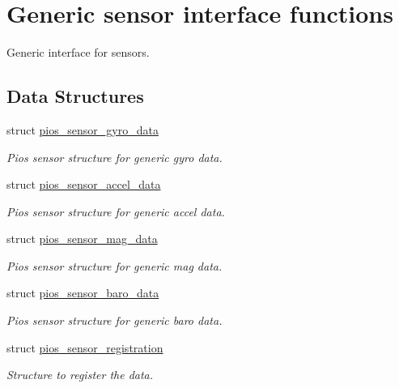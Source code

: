 \hypertarget{group___p_i_o_s___s_e_n_s_o_r_s}{\section{\-Generic sensor interface functions}
\label{group___p_i_o_s___s_e_n_s_o_r_s}
}


\-Generic interface for sensors.  


\subsection*{\-Data \-Structures}
\begin{DoxyCompactItemize}
\item 
struct \hyperlink{structpios__sensor__gyro__data}{pios\-\_\-sensor\-\_\-gyro\-\_\-data}
\begin{DoxyCompactList}\small\item\em \-Pios sensor structure for generic gyro data. \end{DoxyCompactList}\item 
struct \hyperlink{structpios__sensor__accel__data}{pios\-\_\-sensor\-\_\-accel\-\_\-data}
\begin{DoxyCompactList}\small\item\em \-Pios sensor structure for generic accel data. \end{DoxyCompactList}\item 
struct \hyperlink{structpios__sensor__mag__data}{pios\-\_\-sensor\-\_\-mag\-\_\-data}
\begin{DoxyCompactList}\small\item\em \-Pios sensor structure for generic mag data. \end{DoxyCompactList}\item 
struct \hyperlink{structpios__sensor__baro__data}{pios\-\_\-sensor\-\_\-baro\-\_\-data}
\begin{DoxyCompactList}\small\item\em \-Pios sensor structure for generic baro data. \end{DoxyCompactList}\item 
struct \hyperlink{structpios__sensor__registration}{pios\-\_\-sensor\-\_\-registration}
\begin{DoxyCompactList}\small\item\em \-Structure to register the data. \end{DoxyCompactList}\end{DoxyCompactItemize}
